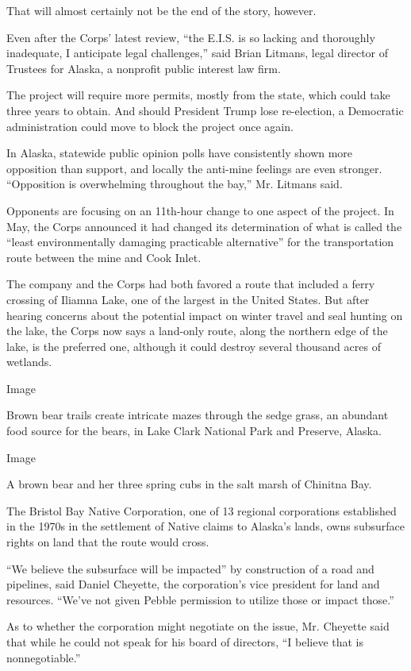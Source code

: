 That will almost certainly not be the end of the story, however.

Even after the Corps' latest review, ``the E.I.S. is so lacking and
thoroughly inadequate, I anticipate legal challenges,'' said Brian
Litmans, legal director of Trustees for Alaska, a nonprofit public
interest law firm.

The project will require more permits, mostly from the state, which
could take three years to obtain. And should President Trump lose
re-election, a Democratic administration could move to block the project
once again.

In Alaska, statewide public opinion polls have consistently shown more
opposition than support, and locally the anti-mine feelings are even
stronger. ``Opposition is overwhelming throughout the bay,'' Mr. Litmans
said.

Opponents are focusing on an 11th-hour change to one aspect of the
project. In May, the Corps announced it had changed its determination of
what is called the ``least environmentally damaging practicable
alternative'' for the transportation route between the mine and Cook
Inlet.

The company and the Corps had both favored a route that included a ferry
crossing of Iliamna Lake, one of the largest in the United States. But
after hearing concerns about the potential impact on winter travel and
seal hunting on the lake, the Corps now says a land-only route, along
the northern edge of the lake, is the preferred one, although it could
destroy several thousand acres of wetlands.

Image

Brown bear trails create intricate mazes through the sedge grass, an
abundant food source for the bears, in Lake Clark National Park and
Preserve, Alaska.

Image

A brown bear and her three spring cubs in the salt marsh of Chinitna
Bay.

The Bristol Bay Native Corporation, one of 13 regional corporations
established in the 1970s in the settlement of Native claims to Alaska's
lands, owns subsurface rights on land that the route would cross.

``We believe the subsurface will be impacted'' by construction of a road
and pipelines, said Daniel Cheyette, the corporation's vice president
for land and resources. ``We've not given Pebble permission to utilize
those or impact those.''

As to whether the corporation might negotiate on the issue, Mr. Cheyette
said that while he could not speak for his board of directors, ``I
believe that is nonnegotiable.''

